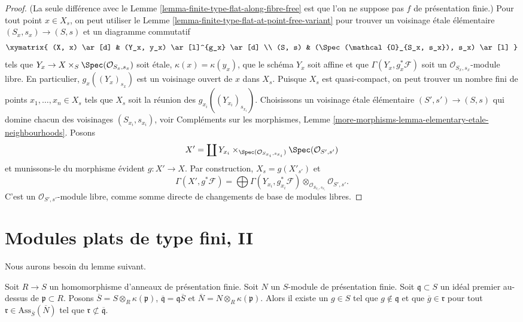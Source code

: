 \begin{proof}
(La seule différence avec le
Lemme \ref{lemma-finite-type-flat-along-fibre-free}
est que l'on ne suppose pas $f$ de présentation finie.)
Pour tout point $x \in X_s$, on peut utiliser le
Lemme \ref{lemma-finite-type-flat-at-point-free-variant}
pour trouver un voisinage \'etale élémentaire $(S_x , s_x) \to (S, s)$
et un diagramme commutatif
$$
\xymatrix{
(X, x) \ar[d] & (Y_x, y_x) \ar[l]^{g_x} \ar[d] \\
(S, s) & (\Spec(\mathcal{O}_{S_x, s_x}), s_x) \ar[l]
}
$$
tels que $Y_x \to X \times_S \Spec(\mathcal{O}_{S_x, s_x})$
soit \'etale, $\kappa(x) = \kappa(y_x)$, que le schéma $Y_x$ soit affine et
que $\Gamma(Y_x, g_x^*\mathcal{F})$ soit un
$\mathcal{O}_{S_x, s_x}$-module libre. En particulier,
$g_x((Y_x)_{s_x})$ est un voisinage ouvert de $x$ dans $X_s$.
Puisque $X_s$ est quasi-compact, on peut trouver un nombre fini de points
$x_1, \ldots, x_n \in X_s$ tels que $X_s$ soit la réunion
des $g_{x_i}((Y_{x_i})_{s_{x_i}})$. Choisissons un voisinage \'etale élémentaire
$(S' , s') \to (S, s)$ qui domine chacun des voisinages
$(S_{x_i}, s_{x_i})$, voir
Compléments sur les morphismes,
Lemme \ref{more-morphisms-lemma-elementary-etale-neighbourhoods}.
Posons
$$
X' = \coprod Y_{x_i} \times_{\Spec(\mathcal{O}_{S_{x_i}, s_{x_i}})}
\Spec(\mathcal{O}_{S', s'})
$$
et munissons-le du morphisme évident $g : X' \to X$.
Par construction, $X_s = g(X'_{s'})$ et
$$
\Gamma(X', g^*\mathcal{F})
=
\bigoplus \Gamma(Y_{x_i}, g_{x_i}^*\mathcal{F})
\otimes_{\mathcal{O}_{S_{x_i}, s_{x_i}}}
\mathcal{O}_{S', s'}.
$$
C'est un $\mathcal{O}_{S', s'}$-module libre, comme somme directe
de changements de base de modules libres.
\end{proof}




\section{Modules plats de type fini, II}
\label{section-finite-type-flat-II}

\noindent
Nous aurons besoin du lemme suivant.

\begin{lemma}
\label{lemma-weak-bourbaki-pre-pre}
Soit $R \to S$ un homomorphisme d'anneaux de présentation finie. Soit $N$ un
$S$-module de présentation finie. Soit $\mathfrak q \subset S$ un idéal premier
au-dessus de $\mathfrak p \subset R$. Posons
$\overline{S} = S \otimes_R \kappa(\mathfrak p)$,
$\overline{\mathfrak q} = \mathfrak q \overline{S}$ et
$\overline{N} = N \otimes_R \kappa(\mathfrak p)$. Alors
il existe un $g \in S$ tel que
$g \not \in \mathfrak q$ et que
$\overline{g} \in \mathfrak r$ pour tout
$\mathfrak r \in \text{Ass}_{\overline{S}}(\overline{N})$
tel que $\mathfrak r \not \subset \overline{\mathfrak q}$.
\end{lemma}

